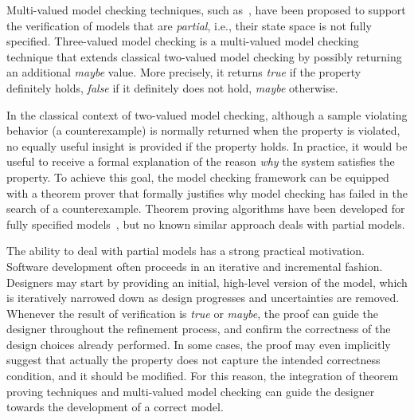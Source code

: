 Multi-valued model checking techniques, such as~\cite{bruns1999model,bruns2000model,gurfinkel2003multi,bruns2004MCmultivalued,DBLP:conf/fm/MenghiSG16}, have been proposed to support the verification of models that are \emph{partial}, i.e.,  their state space is not fully specified.
Three-valued model checking is a multi-valued model checking technique that extends classical two-valued model checking by possibly returning an additional \emph{maybe} value.
More precisely, it returns  \emph{true} if the property definitely holds, \emph{false} if it definitely does not hold,  \emph{maybe} otherwise.




In the classical context of two-valued model checking, although a sample violating behavior (a counterexample) is normally returned when the property is violated, no equally useful insight is provided if the property holds. 
In practice, it would be useful to receive a formal explanation of the reason \emph{why} the system satisfies the property.
To achieve this goal, the model checking framework can be equipped with a theorem prover that formally justifies why model checking has failed in the search of a counterexample.
Theorem proving algorithms have been developed for fully specified models~\cite{peled2001falsification,peled2001model}, but no known similar approach deals with partial models.

The ability to deal with partial models has a strong practical motivation. Software development often proceeds in an iterative and incremental fashion. Designers may start by providing an initial, high-level version of the model, which is iteratively narrowed down as design progresses and uncertainties are removed.
Whenever the result of verification  is \emph{true} or \emph{maybe}, the proof can guide the designer throughout the refinement process, and confirm the correctness of the design choices already performed. 
In some cases, the proof may even implicitly suggest that actually the property does not capture the intended correctness condition, and it should be modified.
For this reason, the integration of theorem proving techniques and multi-valued model checking can guide the designer towards the development of a correct model.

